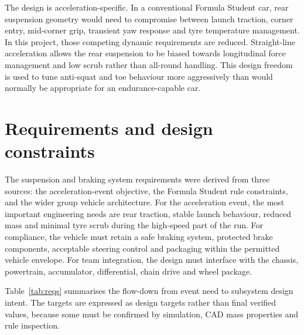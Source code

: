 The design is acceleration-specific. In a conventional Formula Student car, rear suspension geometry would need to compromise between launch traction, corner entry, mid-corner grip, transient yaw response and tyre temperature management. In this project, those competing dynamic requirements are reduced. Straight-line acceleration allows the rear suspension to be biased towards longitudinal force management and low scrub rather than all-round handling. This design freedom is used to tune anti-squat and toe behaviour more aggressively than would normally be appropriate for an endurance-capable car.


\section{Requirements and design constraints}
\label{sec:suspension_requirements}

The suspension and braking system requirements were derived from three sources: the acceleration-event objective, the Formula Student rule constraints, and the wider group vehicle architecture. For the acceleration event, the most important engineering needs are rear traction, stable launch behaviour, reduced mass and minimal tyre scrub during the high-speed part of the run. For compliance, the vehicle must retain a safe braking system, protected brake components, acceptable steering control and packaging within the permitted vehicle envelope. For team integration, the design must interface with the chassis, powertrain, accumulator, differential, chain drive and wheel package.

Table~\ref{tab:reqs} summarises the flow-down from event need to subsystem design intent. The targets are expressed as design targets rather than final verified values, because some must be confirmed by simulation, CAD mass properties and rule inspection.

